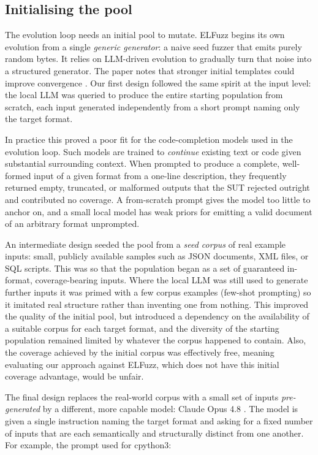 \subsection{Initialising the pool}
\label{sec:init}

The evolution loop needs an initial pool to mutate. ELFuzz begins its own evolution from a single \textit{generic generator}: a naive seed fuzzer that emits purely random bytes. It relies on LLM-driven evolution to gradually turn that noise into a structured generator. The paper notes that stronger initial templates could improve convergence \cite{chen_2025_elfuzz}. Our first design followed the same spirit at the input level: the local LLM was queried to produce the entire starting population from scratch, each input generated independently from a short prompt naming only the target format.

In practice this proved a poor fit for the code-completion models used in the evolution loop. Such models are trained to \textit{continue} existing text or code given substantial surrounding context. When prompted to produce a complete, well-formed input of a given format from a one-line description, they frequently returned empty, truncated, or malformed outputs that the SUT rejected outright and contributed no coverage. A from-scratch prompt gives the model too little to anchor on, and a small local model has weak priors for emitting a valid document of an arbitrary format unprompted.

An intermediate design seeded the pool from a \textit{seed corpus} of real example inputs: small, publicly available samples such as JSON documents, XML files, or SQL scripts. This was so that the population began as a set of guaranteed in-format, coverage-bearing inputs. Where the local LLM was still used to generate further inputs it was primed with a few corpus examples (few-shot prompting) so it imitated real structure rather than inventing one from nothing. This improved the quality of the initial pool, but introduced a dependency on the availability of a suitable corpus for each target format, and the diversity of the starting population remained limited by whatever the corpus happened to contain. Also, the coverage achieved by the initial corpus was effectively free, meaning evaluating our approach against ELFuzz, which does not have this initial coverage advantage, would be unfair.

The final design replaces the real-world corpus with a small set of inputs \textit{pre-generated} by a different, more capable model: Claude Opus 4.8 \cite{anthropic_2025_claude}. The model is given a single instruction naming the target format and asking for a fixed number of inputs that are each semantically and structurally distinct from one another. For example, the prompt used for cpython3:

